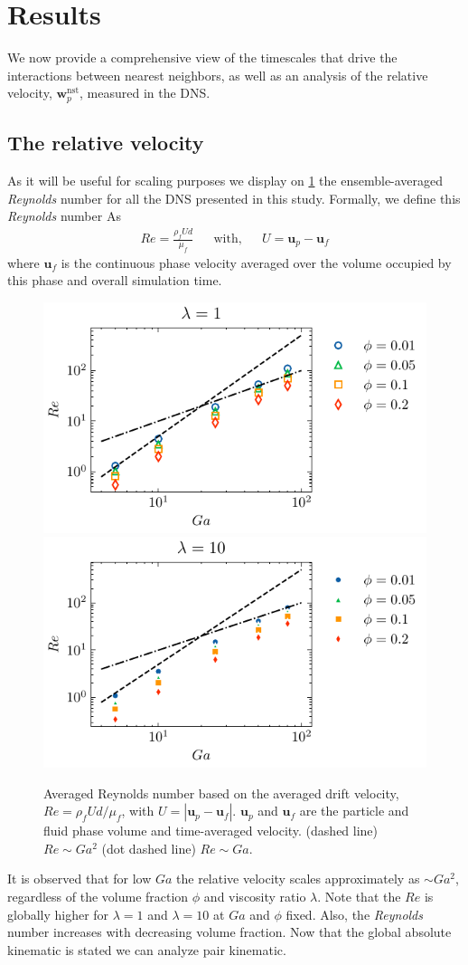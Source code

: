 \section{Results}
\label{sec:results}

We now provide a comprehensive view of the timescales that drive the interactions between nearest neighbors, as well as an analysis of the relative velocity, $\textbf{w}_p^\text{nst}$, measured in the DNS.

\subsection{The relative velocity}

As it will be useful for scaling purposes we display on \ref{fig:Reall} the ensemble-averaged \textit{Reynolds} number for all the DNS presented in this study.
Formally, we define this \textit{Reynolds} number As
\begin{align*}
    Re = \frac{\rho_f U d}{\mu_f} && \text{with}, && U = \textbf{u}_p - \textbf{u}_f
\end{align*}
where $\textbf{u}_f$ is the continuous phase velocity averaged over the volume occupied by this phase and overall simulation time. 
\begin{figure}[h!]
    \centering
    \includegraphics[height = 0.25\textwidth]{image/HOMOGENEOUS_final/CA/Re_l_1.pdf}
    \includegraphics[height = 0.25\textwidth]{image/HOMOGENEOUS_final/CA/Re_l_10.pdf}
    \caption{
        Averaged Reynolds number based on the averaged drift velocity, $Re = \rho_f U d /\mu_f$, with $U = |\textbf{u}_p - \textbf{u}_f|$.
        $\textbf{u}_p$ and $\textbf{u}_f$ are the particle and fluid phase volume and time-averaged velocity.
        (dashed line) $Re \sim Ga^2$ (dot dashed line) $Re \sim Ga$. 
    }
    \label{fig:Reall}
\end{figure}
It is observed that for low $Ga$ the relative velocity scales approximately as $\sim Ga^2$, regardless of the volume fraction $\phi$ and viscosity ratio $\lambda$. 
Note that the $Re$ is globally higher for $\lambda  =1$ and $\lambda = 10$ at $Ga$ and $\phi$ fixed. 
Also, the \textit{Reynolds} number increases with decreasing volume fraction. 
Now that the global absolute kinematic is stated we can analyze pair kinematic. 

